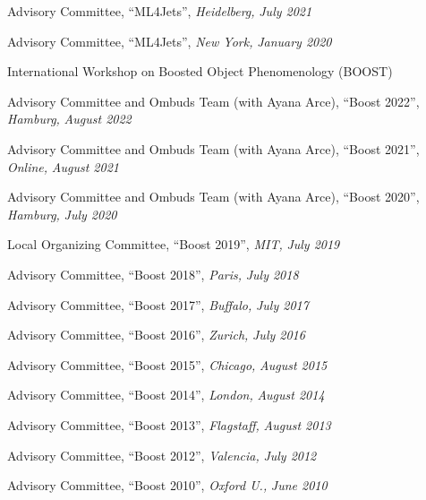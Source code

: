 \item Advisory Committee, ``ML4Jets'', \emph{Heidelberg, }\emph{July 2021}
\item Advisory Committee, ``ML4Jets'', \emph{New York, }\emph{January 2020}
\el 
\item International Workshop on Boosted Object Phenomenology (BOOST)
\bsbl 
\item Advisory Committee and Ombuds Team (with Ayana Arce), ``Boost 2022'', \emph{Hamburg, }\emph{August 2022}
\item Advisory Committee and Ombuds Team (with Ayana Arce), ``Boost 2021'', \emph{Online, }\emph{August 2021}
\item Advisory Committee and Ombuds Team (with Ayana Arce), ``Boost 2020'', \emph{Hamburg, }\emph{July 2020}
\item Local Organizing Committee, ``Boost 2019'', \emph{MIT, }\emph{July 2019}
\item Advisory Committee, ``Boost 2018'', \emph{Paris, }\emph{July 2018}
\item Advisory Committee, ``Boost 2017'', \emph{Buffalo, }\emph{July 2017}
\item Advisory Committee, ``Boost 2016'', \emph{Zurich, }\emph{July 2016}
\item Advisory Committee, ``Boost 2015'', \emph{Chicago, }\emph{August 2015}
\item Advisory Committee, ``Boost 2014'', \emph{London, }\emph{August 2014}
\item Advisory Committee, ``Boost 2013'', \emph{Flagstaff, }\emph{August 2013}
\item Advisory Committee, ``Boost 2012'', \emph{Valencia, }\emph{July 2012}
\item Advisory Committee, ``Boost 2010'', \emph{Oxford U., }\emph{June 2010}
\el 

